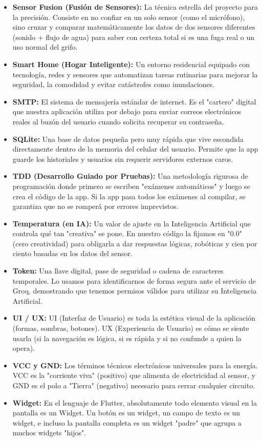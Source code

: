 \documentclass[11pt,a4paper]{article}
\begin{document}
\begin{itemize}
    \item \textbf{Sensor Fusion (Fusión de Sensores):} La técnica estrella del proyecto para la precisión. Consiste en no confiar en un solo sensor (como el micrófono), sino cruzar y comparar matemáticamente los datos de dos sensores diferentes (sonido + flujo de agua) para saber con certeza total si es una fuga real o un uso normal del grifo.
    \item \textbf{Smart Home (Hogar Inteligente):} Un entorno residencial equipado con tecnología, redes y sensores que automatizan tareas rutinarias para mejorar la seguridad, la comodidad y evitar catástrofes como inundaciones.
    \item \textbf{SMTP:} El sistema de mensajería estándar de internet. Es el "cartero" digital que nuestra aplicación utiliza por debajo para enviar correos electrónicos reales al buzón del usuario cuando solicita recuperar su contraseña.
    \item \textbf{SQLite:} Una base de datos pequeña pero muy rápida que vive escondida directamente dentro de la memoria del celular del usuario. Permite que la app guarde los historiales y usuarios sin requerir servidores externos caros.
    \item \textbf{TDD (Desarrollo Guiado por Pruebas):} Una metodología rigurosa de programación donde primero se escriben "exámenes automáticos" y luego se crea el código de la app. Si la app pasa todos los exámenes al compilar, se garantiza que no se romperá por errores imprevistos.
    \item \textbf{Temperatura (en IA):} Un valor de ajuste en la Inteligencia Artificial que controla qué tan "creativa" se pone. En nuestro código la fijamos en "0.0" (cero creatividad) para obligarla a dar respuestas lógicas, robóticas y cien por ciento basadas en los datos del sensor.
    \item \textbf{Token:} Una llave digital, pase de seguridad o cadena de caracteres temporales. Lo usamos para identificarnos de forma segura ante el servicio de Groq, demostrando que tenemos permisos válidos para utilizar su Inteligencia Artificial.
    \item \textbf{UI / UX:} UI (Interfaz de Usuario) es toda la estética visual de la aplicación (formas, sombras, botones). UX (Experiencia de Usuario) es cómo se siente usarla (si la navegación es lógica, si es rápida y si no confunde a quien la opera).
    \item \textbf{VCC y GND:} Los términos técnicos electrónicos universales para la energía. VCC es la "corriente viva" (positivo) que alimenta de electricidad al sensor, y GND es el polo a "Tierra" (negativo) necesario para cerrar cualquier circuito.
    \item \textbf{Widget:} En el lenguaje de Flutter, absolutamente todo elemento visual en la pantalla es un Widget. Un botón es un widget, un campo de texto es un widget, e incluso la pantalla completa es un widget "padre" que agrupa a muchos widgets "hijos".
\end{itemize}
\end{document}
